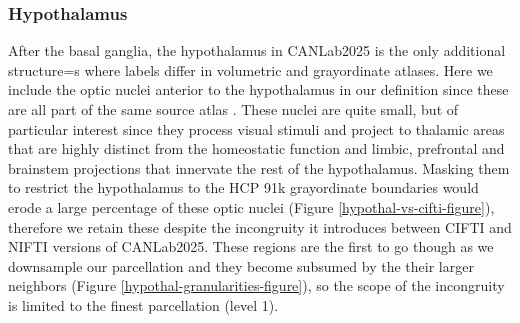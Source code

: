\documentclass[10pt,letterpaper]{article}
\begin{document}
\subsubsection{Hypothalamus} 
After the basal ganglia, the hypothalamus in CANLab2025 is the only additional structure=s where labels differ in volumetric and grayordinate atlases. Here we include the optic nuclei anterior to the hypothalamus in our definition since these are all part of the same source atlas . These nuclei are quite small, but of particular interest since they process visual stimuli and project to thalamic areas that are highly distinct from the homeostatic function and limbic, prefrontal and brainstem projections that innervate the rest of the hypothalamus. Masking them to restrict the hypothalamus to the HCP 91k grayordinate boundaries would erode a large percentage of these optic nuclei (Figure \ref{hypothal-vs-cifti-figure}), therefore we retain these despite the incongruity it introduces between CIFTI and NIFTI versions of CANLab2025. These regions are the first to go though as we downsample our parcellation and they become subsumed by the their larger neighbors (Figure \ref{hypothal-granularities-figure}), so the scope of the incongruity is limited to the finest parcellation (level 1).
\end{document}
